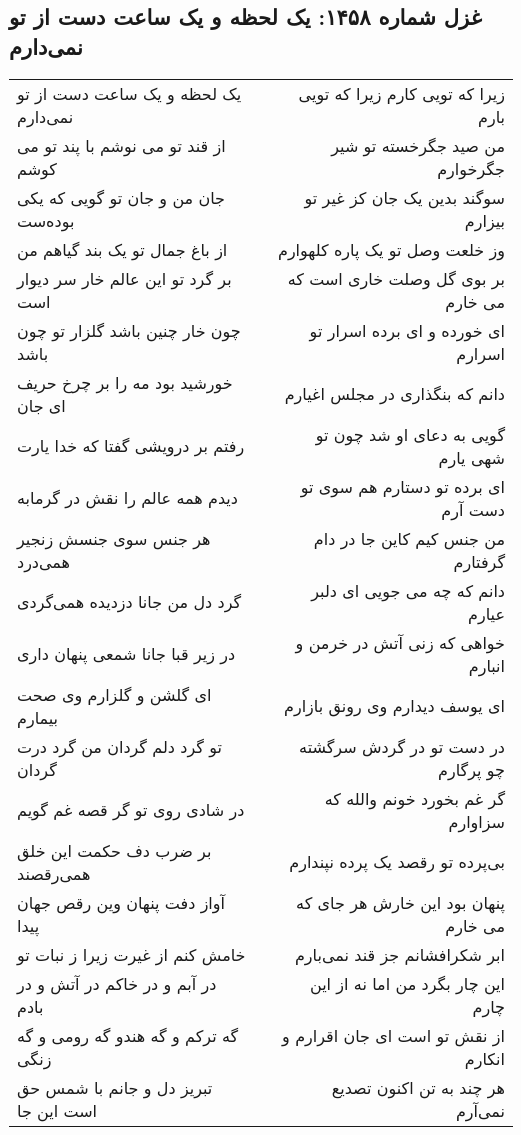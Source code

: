 \begin{center}
\section*{غزل شماره ۱۴۵۸: یک لحظه و یک ساعت دست از تو نمی‌دارم}
\label{sec:1458}
\begin{longtable}{l p{0.5cm} r}
یک لحظه و یک ساعت دست از تو نمی‌دارم
&&
زیرا که تویی کارم زیرا که تویی بارم
\\
از قند تو می نوشم با پند تو می کوشم
&&
من صید جگرخسته تو شیر جگرخوارم
\\
جان من و جان تو گویی که یکی بوده‌ست
&&
سوگند بدین یک جان کز غیر تو بیزارم
\\
از باغ جمال تو یک بند گیاهم من
&&
وز خلعت وصل تو یک پاره کلهوارم
\\
بر گرد تو این عالم خار سر دیوار است
&&
بر بوی گل وصلت خاری است که می خارم
\\
چون خار چنین باشد گلزار تو چون باشد
&&
ای خورده و ای برده اسرار تو اسرارم
\\
خورشید بود مه را بر چرخ حریف ای جان
&&
دانم که بنگذاری در مجلس اغیارم
\\
رفتم بر درویشی گفتا که خدا یارت
&&
گویی به دعای او شد چون تو شهی یارم
\\
دیدم همه عالم را نقش در گرمابه
&&
ای برده تو دستارم هم سوی تو دست آرم
\\
هر جنس سوی جنسش زنجیر همی‌درد
&&
من جنس کیم کاین جا در دام گرفتارم
\\
گرد دل من جانا دزدیده همی‌گردی
&&
دانم که چه می جویی ای دلبر عیارم
\\
در زیر قبا جانا شمعی پنهان داری
&&
خواهی که زنی آتش در خرمن و انبارم
\\
ای گلشن و گلزارم وی صحت بیمارم
&&
ای یوسف دیدارم وی رونق بازارم
\\
تو گرد دلم گردان من گرد درت گردان
&&
در دست تو در گردش سرگشته چو پرگارم
\\
در شادی روی تو گر قصه غم گویم
&&
گر غم بخورد خونم والله که سزاوارم
\\
بر ضرب دف حکمت این خلق همی‌رقصند
&&
بی‌پرده تو رقصد یک پرده نپندارم
\\
آواز دفت پنهان وین رقص جهان پیدا
&&
پنهان بود این خارش هر جای که می خارم
\\
خامش کنم از غیرت زیرا ز نبات تو
&&
ابر شکرافشانم جز قند نمی‌بارم
\\
در آبم و در خاکم در آتش و در بادم
&&
این چار بگرد من اما نه از این چارم
\\
گه ترکم و گه هندو گه رومی و گه زنگی
&&
از نقش تو است ای جان اقرارم و انکارم
\\
تبریز دل و جانم با شمس حق است این جا
&&
هر چند به تن اکنون تصدیع نمی‌آرم
\\
\end{longtable}
\end{center}
